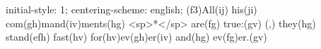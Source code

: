 initial-style: 1;
centering-scheme: english;
(f3)All(ij) his(ji) com(gh)mand(iv)ments(hg) <sp>*</sp> are(fg) true:(gv) (,) they(hg) stand(efh) fast(hv) for(hv)ev(gh)er(iv) and(hg) ev(fg)er.(gv)